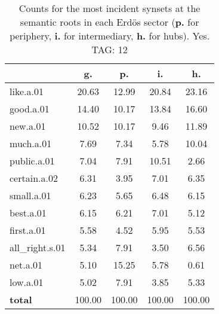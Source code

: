 \begin{table}[h!]
\begin{center}
\begin{tabular}{| l || c | c | c | c |}\hline
 & {\bf g.} & {\bf p.} & {\bf i.} & {\bf h.} \\\hline\hline
like.a.01 & 20.63  & 12.99  & 20.84  & 23.16 \\\hline
good.a.01 & 14.40  & 10.17  & 13.84  & 16.60 \\\hline
new.a.01 & 10.52  & 10.17  & 9.46  & 11.89 \\\hline
much.a.01 & 7.69  & 7.34  & 5.78  & 10.04 \\\hline
public.a.01 & 7.04  & 7.91  & 10.51  & 2.66 \\\hline
certain.a.02 & 6.31  & 3.95  & 7.01  & 6.35 \\\hline
small.a.01 & 6.23  & 5.65  & 6.48  & 6.15 \\\hline
best.a.01 & 6.15  & 6.21  & 7.01  & 5.12 \\\hline
first.a.01 & 5.58  & 4.52  & 5.95  & 5.53 \\\hline
all\_right.s.01 & 5.34  & 7.91  & 3.50  & 6.56 \\\hline
net.a.01 & 5.10  & 15.25  & 5.78  & 0.61 \\\hline
low.a.01 & 5.02  & 7.91  & 3.85  & 5.33 \\\hline\hline
{{\bf total}} & 100.00  & 100.00  & 100.00  & 100.00 \\\hline
\end{tabular}
\caption{Counts for the most incident synsets at the semantic roots in each Erd\"os sector ({\bf p.} for periphery, {\bf i.} for intermediary, {\bf h.} for hubs). Yes. TAG: 12}
\end{center}
\end{table}